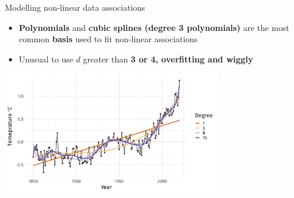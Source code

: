 \documentclass[english]{beamer}
\newcommand{\alertblue}[1]{{\color{blue}#1}}
\begin{document}
\begin{frame}{Modelling non-linear data associations}
    \begin{itemize}
        \item \alertblue{\textbf{Polynomials}} and \alertblue{\textbf{cubic splines (degree 3 polynomials)}} are the most common \alertblue{\textbf{basis}} used to fit non-linear associations 
        \item Unusual to use \(d\) greater than \alertblue{\textbf{3 or 4, overfitting and wiggly}} 
    \end{itemize}
    \centering
    \includegraphics[width=9.5cm,keepaspectratio]{images/overfit.jpg}
\end{frame}
\end{document}
